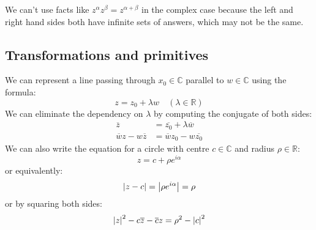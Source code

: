 \begin{note}
	We can't use facts like \(z^\alpha z^\beta = z^{\alpha + \beta}\) in the complex case because the left and right hand sides both have infinite sets of answers, which may not be the same.
\end{note}

\subsection{Transformations and primitives}
We can represent a line passing through \(x_0\in \mathbb C\) parallel to \(w \in \mathbb C\) using the formula:
\[
	z = z_0 + \lambda w\quad(\lambda \in \mathbb R)
\]
We can eliminate the dependency on \(\lambda\) by computing the conjugate of both sides:
\begin{align*}
	\overline{z}                  & = \overline{z_0} + \lambda \overline{w} \\
	\overline{w}z - w\overline{z} & = \overline{w}z_0 - w\overline{z_0}
\end{align*} %
We can also write the equation for a circle with centre \(c \in \mathbb C\) and radius \(\rho \in \mathbb R\):
\[
	z = c + \rho e^{i\alpha}
\]
or equivalently:
\[
	\abs{z - c} = \abs{\rho e^{i\alpha}} = \rho
\]
or by squaring both sides:
\[
	\abs{z}^2 - c\overline{z} - \overline{c}z = \rho^2 - \abs{c}^2
\]
